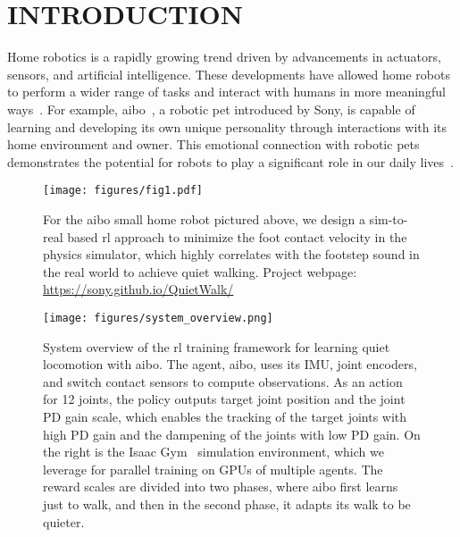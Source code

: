 \section{INTRODUCTION}
Home robotics is a rapidly growing trend driven by advancements in actuators, sensors, and artificial intelligence. These developments have allowed home robots to perform a wider range of tasks and interact with humans in more meaningful ways~\cite{aibo, lovot, qoobo, disney_learning}. 
For example, aibo~\cite{aibo}, a robotic pet introduced by Sony, is capable of learning and developing its own unique personality through interactions with its home environment and owner. This emotional connection with robotic pets demonstrates the potential for robots to play a significant role in our daily lives~\cite{companionAIBO2003, tanaka2021pilot, AIBOasDog2003, KANG2020207}.

\begin{figure}[!t]
    \centering
    \texttt{[image: figures/fig1.pdf]}
    \caption{For the aibo small home robot pictured above, we design a sim-to-real based \ac{rl} approach to minimize the foot contact velocity in the physics simulator, which highly correlates with the footstep sound in the real world to achieve quiet walking. Project webpage: \url{https://sony.github.io/QuietWalk/}}
    \label{fig:quiet_walking_concept}
    \vspace{-2ex}
\end{figure}


\begin{figure*}
    \centering
    \vspace{10pt}
    \texttt{[image: figures/system\_overview.png]}
    \caption{System overview of the \ac{rl} training framework for learning quiet locomotion with aibo. The agent, aibo, uses its IMU, joint encoders, and switch contact sensors to compute observations. As an action for 12 joints, the policy outputs target joint position and the joint PD gain scale, which enables the tracking of the target joints with high PD gain and the dampening of the joints with low PD gain. On the right is the Isaac Gym~\cite{Makoviychuk2021-th} simulation environment, which we leverage for parallel training on GPUs of multiple agents. The reward scales are divided into two phases, where aibo first learns just to walk, and then in the second phase, it adapts its walk to be quieter.}
    \label{fig:system_overview}
    \vspace{-2ex}
\end{figure*}

